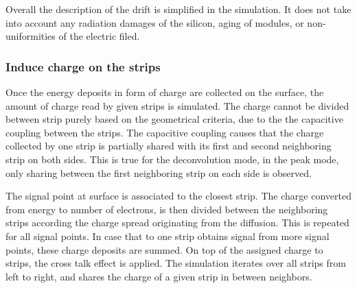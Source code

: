 Overall the description of the drift is simplified in the simulation. It does not take into account any radiation damages of the silicon, aging of modules, or non-uniformities of the electric filed.


\subsubsection{Induce charge on the strips~\label{sec:induce}}

Once the energy deposits in form of charge are collected on the surface, the amount of charge read by given strips is simulated. The charge cannot be divided between strip purely based on the geometrical criteria, due to the the capacitive coupling between the strips. The capacitive coupling causes that the charge collected by one strip is partially shared with its first and second neighboring strip on both sides. This is true for the deconvolution mode, in the peak mode, only sharing between the first neighboring strip on each side is observed.   

The signal point at surface is associated to the closest strip. The charge converted from energy to number of electrons, is then divided between the neighboring strips according the charge spread originating from the diffusion. This is repeated for all signal points. In case that to one strip obtains signal from more signal points, these charge deposits are summed. On top of the assigned charge to strips, the cross talk effect is applied. The simulation iterates over all strips from left to right, and shares the charge of a given strip in between neighbors.

